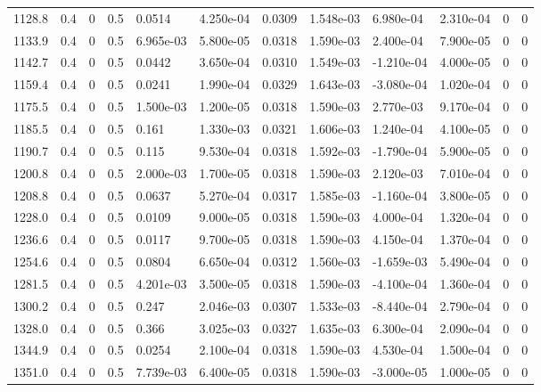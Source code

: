 \documentclass[preview]{standalone}
\begin{document}
{{{{\begin{tabular}{L{1.2cm}C{1.2cm} C{0.3cm}C{0.5cm} C{1.4cm}C{1.4cm} C{1.4cm}C{1.4cm} C{1.6cm}C{1.6cm} C{1.6cm}C{1.6cm}}
  1128.8  &   0.4  & 0     & 0.5 &  0.0514  & 4.250e-04  &  0.0309&   1.548e-03& 6.980e-04 & 2.310e-04   &  0 & 0  \\ 
  1133.9  &   0.4  & 0     & 0.5 &  6.965e-03  & 5.800e-05  &  0.0318&   1.590e-03& 2.400e-04 & 7.900e-05   &  0 & 0  \\ 
  1142.7  &   0.4  & 0     & 0.5 &  0.0442  & 3.650e-04  &  0.0310&   1.549e-03& -1.210e-04 & 4.000e-05   &  0 & 0  \\ 
  1159.4  &   0.4  & 0     & 0.5 &  0.0241  & 1.990e-04  &  0.0329&   1.643e-03& -3.080e-04 & 1.020e-04   &  0 & 0  \\ 
  1175.5  &   0.4  & 0     & 0.5 &  1.500e-03  & 1.200e-05  &  0.0318&   1.590e-03& 2.770e-03 & 9.170e-04   &  0 & 0  \\ 
  1185.5  &   0.4  & 0     & 0.5 &  0.161  & 1.330e-03  &  0.0321&   1.606e-03& 1.240e-04 & 4.100e-05   &  0 & 0  \\ 
  1190.7  &   0.4  & 0     & 0.5 &  0.115  & 9.530e-04  &  0.0318&   1.592e-03& -1.790e-04 & 5.900e-05   &  0 & 0  \\ 
  1200.8  &   0.4  & 0     & 0.5 &  2.000e-03  & 1.700e-05  &  0.0318&   1.590e-03& 2.120e-03 & 7.010e-04   &  0 & 0  \\ 
  1208.8  &   0.4  & 0     & 0.5 &  0.0637  & 5.270e-04  &  0.0317&   1.585e-03& -1.160e-04 & 3.800e-05   &  0 & 0  \\ 
  1228.0  &   0.4  & 0     & 0.5 &  0.0109  & 9.000e-05  &  0.0318&   1.590e-03& 4.000e-04 & 1.320e-04   &  0 & 0  \\ 
  1236.6  &   0.4  & 0     & 0.5 &  0.0117  & 9.700e-05  &  0.0318&   1.590e-03& 4.150e-04 & 1.370e-04   &  0 & 0  \\ 
  1254.6  &   0.4  & 0     & 0.5 &  0.0804  & 6.650e-04  &  0.0312&   1.560e-03& -1.659e-03 & 5.490e-04   &  0 & 0  \\ 
  1281.5  &   0.4  & 0     & 0.5 &  4.201e-03  & 3.500e-05  &  0.0318&   1.590e-03& -4.100e-04 & 1.360e-04   &  0 & 0  \\ 
  1300.2  &   0.4  & 0     & 0.5 &  0.247  & 2.046e-03  &  0.0307&   1.533e-03& -8.440e-04 & 2.790e-04   &  0 & 0  \\ 
  1328.0  &   0.4  & 0     & 0.5 &  0.366  & 3.025e-03  &  0.0327&   1.635e-03& 6.300e-04 & 2.090e-04   &  0 & 0  \\ 
  1344.9  &   0.4  & 0     & 0.5 &  0.0254  & 2.100e-04  &  0.0318&   1.590e-03& 4.530e-04 & 1.500e-04   &  0 & 0  \\ 
  1351.0  &   0.4  & 0     & 0.5 &  7.739e-03  & 6.400e-05  &  0.0318&   1.590e-03& -3.000e-05 & 1.000e-05   &  0 & 0  \\ 

\end{tabular}}}}}
\end{document}
